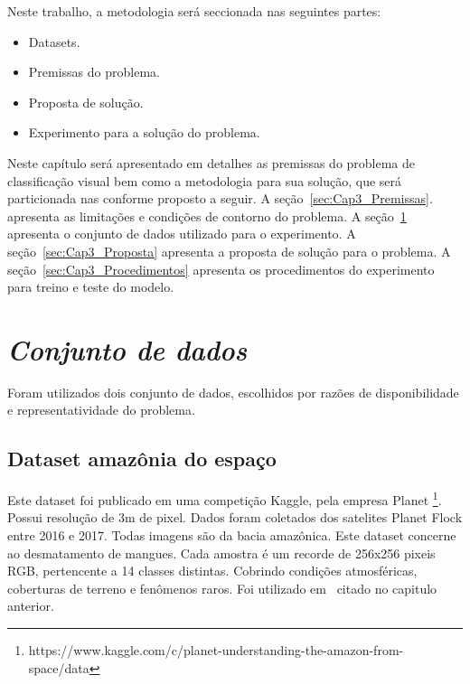 Neste trabalho, a metodologia será seccionada nas seguintes partes:
\begin{itemize}
    \item  Datasets.
    \item  Premissas do problema.
    \item  Proposta de solução.
    \item  Experimento para a solução do problema.

\end{itemize}

Neste capítulo será apresentado em detalhes as premissas do problema de classificação visual bem como a metodologia para sua solução, que será particionada nas conforme proposto a seguir. A seção~\ref{sec:Cap3_Premissas}. apresenta as limitações e condições de contorno do problema. A seção~\ref{sec:Cap3_Dataset} apresenta o conjunto de dados utilizado para o experimento. A seção~\ref{sec:Cap3_Proposta} apresenta a proposta de solução para o problema. A seção~\ref{sec:Cap3_Procedimentos} apresenta os procedimentos do experimento para treino e teste do modelo.


\section{\textit{Conjunto de dados}}\label{sec:Cap3_Dataset}
Foram utilizados dois conjunto de dados, escolhidos por razões de disponibilidade e representatividade do problema. 


\subsection{Dataset amazônia do espaço}\label{sec:Cap3_Amazon_dataset}

Este dataset foi publicado em uma competição Kaggle, pela empresa Planet \footnote{https://www.kaggle.com/c/planet-understanding-the-amazon-from-space/data}. Possui resolução de 3m de pixel. Dados foram coletados dos satelites Planet Flock entre 2016 e 2017. Todas imagens são da bacia amazônica. Este dataset concerne ao desmatamento de mangues. Cada amostra é um recorde de 256x256 pixeis RGB, pertencente a 14 classes distintas. Cobrindo condições atmosféricas, coberturas de terreno e fenômenos raros. Foi utilizado em~\cite{9701667} citado no capitulo anterior.

